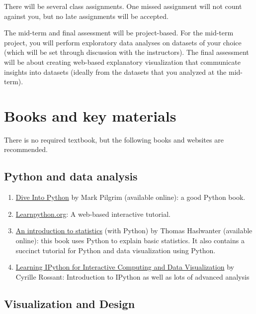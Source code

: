 \documentclass[11pt,article,oneside]{memoir}
\begin{document}
There will be several class assignments. One missed assignment will not count
against you, but no late assignments will be accepted. 

The mid-term and final assessment will be project-based. For the mid-term
project, you will perform exploratory data analyses on datasets of your choice
(which will be set through discussion with the instructors). The final
assessment will be about creating web-based explanatory visualization that
communicate insights into datasets (ideally from the datasets that you analyzed
at the mid-term). 

\section{Books and key materials}

There is no required textbook, but the following books and websites are recommended.

\subsection{Python and data analysis}

\begin{enumerate}

\item \href{http://www.diveintopython3.net/index.html}{Dive Into Python} by Mark Pilgrim (available online): a good Python book. 

\item \href{http://www.learnpython.org}{Learnpython.org}: A web-based interactive tutorial. 

\item \href{http://work.thaslwanter.at/Stats/html/}{An introduction to statistics} (with Python) by Thomas Haslwanter (available online): this book uses Python to explain basic statistics. It also contains a succinct tutorial for Python and data visualization using Python. 

\item \href{http://ipython.rossant.net}{Learning IPython for Interactive Computing and Data Visualization} by  Cyrille Rossant: Introduction to IPython as well as lots of advanced analysis 


\end{enumerate}

\subsection{Visualization and Design}
\end{document}

